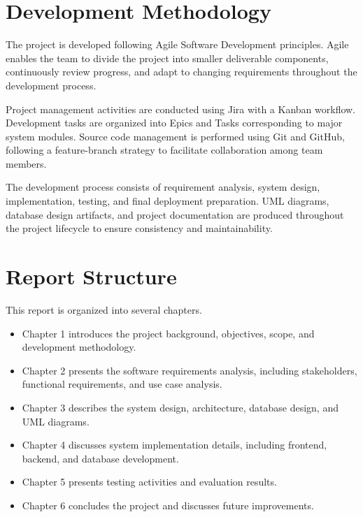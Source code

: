 \section{Development Methodology}

The project is developed following Agile Software Development principles. Agile enables the team to divide the project into smaller deliverable components, continuously review progress, and adapt to changing requirements throughout the development process.

Project management activities are conducted using Jira with a Kanban workflow. Development tasks are organized into Epics and Tasks corresponding to major system modules. Source code management is performed using Git and GitHub, following a feature-branch strategy to facilitate collaboration among team members.

The development process consists of requirement analysis, system design, implementation, testing, and final deployment preparation. UML diagrams, database design artifacts, and project documentation are produced throughout the project lifecycle to ensure consistency and maintainability.

\section{Report Structure}

This report is organized into several chapters.

\begin{itemize}
	\item Chapter 1 introduces the project background, objectives, scope, and development methodology.
	\item Chapter 2 presents the software requirements analysis, including stakeholders, functional requirements, and use case analysis.
	\item Chapter 3 describes the system design, architecture, database design, and UML diagrams.
	\item Chapter 4 discusses system implementation details, including frontend, backend, and database development.
	\item Chapter 5 presents testing activities and evaluation results.
	\item Chapter 6 concludes the project and discusses future improvements.
\end{itemize}

